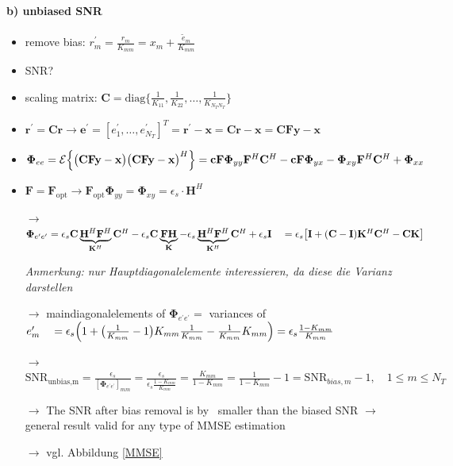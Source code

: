 \documentclass[a4paper, 10pt]{article}
\begin{document}
\paragraph*{b) unbiased SNR}
\label{unbiased_SNR}
\begin{itemize}
	\item remove bias: $r_m^\prime = \frac{r_m}{K_{mm}} = x_m + \frac{\tilde{e}_m}{K_{mm}} $
	\item SNR?
	\item scaling matrix: $ \mathbf{C} = \text{diag}\bigl\{\frac{1}{K_{11}}, \frac{1}{K_{22}}, \dots, \frac{1}{K_{N_TN_T}}  \bigr\} $
	\item $\mathbf{r}^\prime = \mathbf{Cr} \rightarrow \mathbf{e}^\prime = [e^\prime_1, \dots, e^\prime_{N_T}]^T = \mathbf{r}^\prime - \mathbf{x}  = \mathbf{Cr} - \mathbf{x} = \mathbf{CFy} - \mathbf{x} $
	\item $\boldsymbol{\Phi}_{ee} = \mathcal{E}\Bigl\{\bigr(\mathbf{CFy} - \mathbf{x}\bigr)\bigl(\mathbf{CFy} - \mathbf{x}\bigr)^H\Bigr\} = \mathbf{cF}\boldsymbol{\Phi}_{yy}\mathbf{F}^H\mathbf{C}^H - \mathbf{cF}\boldsymbol{\Phi}_{yx} - \boldsymbol{\Phi}_{xy}\mathbf{F}^H\mathbf{C}^H + \boldsymbol{\Phi}_{xx}$
	\item $ \mathbf{F} = 	\mathbf{F}_{\text{opt}} \rightarrow \mathbf{F}_{\text{opt}}\boldsymbol{\Phi}_{yy} = \boldsymbol{\Phi}_{xy} = \epsilon_s\cdot\mathbf{H}^H $
	\item[$\rightarrow$] $\boldsymbol{\Phi}_{e^\prime e^\prime} = \epsilon_s\mathbf{C}\underbrace{\mathbf{H}^H\mathbf{F}^H}_{\mathbf{K}^H}\mathbf{C}^H - \epsilon_s\mathbf{C}\underbrace{\mathbf{FH}}_{\mathbf{K}} - \epsilon_s\underbrace{\mathbf{H}^H\mathbf{F}^H}_{\mathbf{K}^H}\mathbf{C}^H  + \epsilon_s\mathbf{I} \\ \quad = \epsilon_s\bigl[\mathbf{I} + (\mathbf{C} - \mathbf{I})\mathbf{K}^H\mathbf{C}^H - \mathbf{CK}\bigr]$  
	\item[] \textit{Anmerkung: nur Hauptdiagonalelemente interessieren, da diese die Varianz darstellen}
	\item[$\rightarrow$] maindiagonalelements of $\boldsymbol{\Phi}_{e^\prime e^\prime} =  $ variances of $ e^\prime _m \quad = \epsilon_s\Bigl ( 1 + \bigl (\frac{1}{K_{mm}} - 1\bigr )   K_{mm}\frac{1}{K_{mm}}  - \frac{1}{K_{mm}}  K_{mm}\Bigr )  = \epsilon_s\frac{1 - K_{mm}}{K_{mm}}$
	\item[$\rightarrow$] $\text{SNR}_{\text{unbias,m}} = \frac{\epsilon_s}{[\boldsymbol{\Phi}_{e^\prime e^\prime}]_{mm}} = \frac{\epsilon_s}{\epsilon_s\frac{1 - K_{mm}}{K_{mm}}} = \frac{K_{mm}}{1 - K_{mm}} = \frac{1}{1 - K_{mm}} - 1 = \text{SNR}_{bias,m} - 1,  \quad 1\leq m \leq N_T $
	\item[$\rightarrow$] The SNR after bias removal is by \grqq\, smaller than the \glqq biased \grqq SNR $\rightarrow$ general result valid for any type of MMSE estimation
	\item[$\rightarrow$] vgl. Abbildung \ref{MMSE}
\end{itemize}
\end{document}
